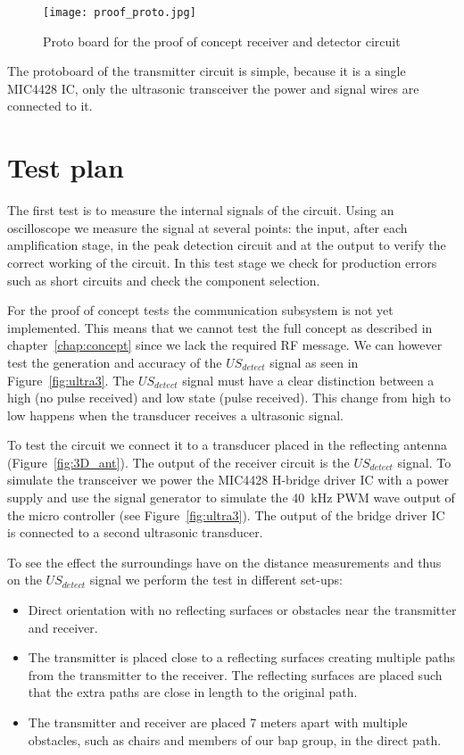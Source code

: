 \begin{figure}[H]
\centering
\texttt{[image: proof\_proto.jpg]}
\caption{Proto board for the proof of concept receiver and detector circuit}\label{fig:proto}
\label{fig:protoboard}
\end{figure}

The protoboard of the transmitter circuit is simple, because it is a single MIC4428 \cite{MIC4428}
 IC, only the ultrasonic transceiver the power and signal wires are connected to it.

\section{Test plan}
The first test is to measure the internal signals of the circuit.
Using an oscilloscope we measure the signal at several points: the input, after each amplification stage, in the peak detection circuit and at the output to verify the correct working of the circuit.
In this test stage we check for production errors such as short circuits and check the component selection.

For the proof of concept tests the communication subsystem is not yet implemented.
This means that we cannot test the full concept as described in chapter~\ref{chap:concept} since we lack the required RF message.
We can however test the generation and accuracy of the $US_{detect}$ signal as seen in Figure~\ref{fig:ultra3}.
The $US_{detect}$ signal must have a clear distinction between a high (no pulse received) and low state (pulse received).
This change from high to low happens when the transducer receives a ultrasonic signal.

To test the circuit we connect it to a transducer placed in the reflecting antenna (Figure~\ref{fig:3D_ant}).
The output of the receiver circuit is the $US_{detect}$ signal.
To simulate the transceiver we power the MIC4428 \cite{MIC4428}
H-bridge driver IC with a power supply and use the signal generator to simulate the \SI{40}{\kilo\hertz} PWM wave output of the micro controller (see Figure~\ref{fig:ultra3}).
The output of the bridge driver IC is connected to a second ultrasonic transducer.

To see the effect the surroundings have on the distance measurements and thus on the $US_{detect}$ signal we perform the test in different set-ups:

\begin{itemize}
\item
Direct orientation with no reflecting surfaces or obstacles near the transmitter and receiver.
\item
The transmitter is placed close to a reflecting surfaces creating multiple paths from the transmitter to the receiver.
The reflecting surfaces are placed such that the extra paths are close in length to the original path.
\item
The transmitter and receiver are placed 7 meters apart with multiple obstacles, such as chairs and members of our bap group, in the direct path.
\end{itemize}

